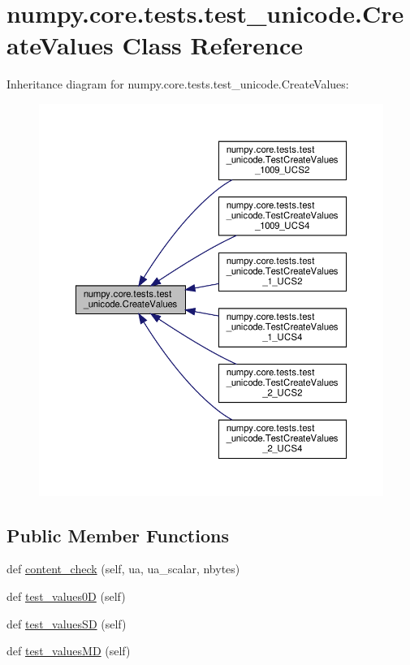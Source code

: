 \hypertarget{classnumpy_1_1core_1_1tests_1_1test__unicode_1_1CreateValues}{}\section{numpy.\+core.\+tests.\+test\+\_\+unicode.\+Create\+Values Class Reference}
\label{classnumpy_1_1core_1_1tests_1_1test__unicode_1_1CreateValues}


Inheritance diagram for numpy.\+core.\+tests.\+test\+\_\+unicode.\+Create\+Values\+:
\nopagebreak
\begin{figure}[H]
\begin{center}
\leavevmode
\includegraphics[width=350pt]{classnumpy_1_1core_1_1tests_1_1test__unicode_1_1CreateValues__inherit__graph}
\end{center}
\end{figure}
\subsection*{Public Member Functions}
\begin{DoxyCompactItemize}
\item 
def \hyperlink{classnumpy_1_1core_1_1tests_1_1test__unicode_1_1CreateValues_a5b8781650dd6c1cb4985941b97d11625}{content\+\_\+check} (self, ua, ua\+\_\+scalar, nbytes)
\item 
def \hyperlink{classnumpy_1_1core_1_1tests_1_1test__unicode_1_1CreateValues_a7df788067c71ad75630f849c6f90211f}{test\+\_\+values0D} (self)
\item 
def \hyperlink{classnumpy_1_1core_1_1tests_1_1test__unicode_1_1CreateValues_a00e95f4a34c87dbe540a620218d63283}{test\+\_\+values\+SD} (self)
\item 
def \hyperlink{classnumpy_1_1core_1_1tests_1_1test__unicode_1_1CreateValues_a6f4117f4fd1c302952a1cc818b22f049}{test\+\_\+values\+MD} (self)
\end{DoxyCompactItemize}
